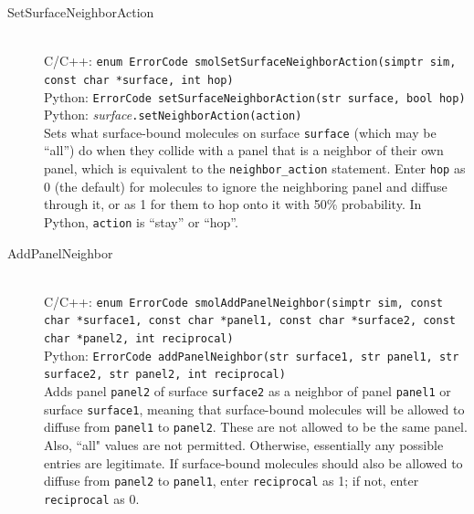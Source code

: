 \documentclass {scrbook}
\newcommand {\ttt} {\texttt}
\begin{document}
\begin{description}
\item[SetSurfaceNeighborAction]
\hfill \\
C/C++: \ttt{enum ErrorCode smolSetSurfaceNeighborAction(simptr sim, const char *surface, int hop)}\\
Python: \ttt{ErrorCode setSurfaceNeighborAction(str surface, bool hop)}\\
Python: \textit{surface}\ttt{.setNeighborAction(action)}\\
Sets what surface-bound molecules on surface \ttt{surface} (which may be ``all'') do when they collide with a panel that is a neighbor of their own panel, which is equivalent to the \ttt{neighbor\_action} statement. Enter \ttt{hop} as 0 (the default) for molecules to ignore the neighboring panel and diffuse through it, or as 1 for them to hop onto it with 50\% probability. In Python, \ttt{action} is ``stay'' or ``hop''.

\item[AddPanelNeighbor]
\hfill \\
C/C++: \ttt{enum ErrorCode smolAddPanelNeighbor(simptr sim, const char *surface1, const char *panel1, const char *surface2, const char *panel2, int reciprocal)}\\
Python: \ttt{ErrorCode addPanelNeighbor(str surface1, str panel1, str surface2, str panel2, int reciprocal)}\\
Adds panel \ttt{panel2} of surface \ttt{surface2} as a neighbor of panel \ttt{panel1} or surface \ttt{surface1}, meaning that surface-bound molecules will be allowed to diffuse from \ttt{panel1} to \ttt{panel2}. These are not allowed to be the same panel. Also, ``all" values are not permitted. Otherwise, essentially any possible entries are legitimate. If surface-bound molecules should also be allowed to diffuse from \ttt{panel2} to \ttt{panel1}, enter \ttt{reciprocal} as 1; if not, enter \ttt{reciprocal} as 0.


\end{description}
\end{document}
